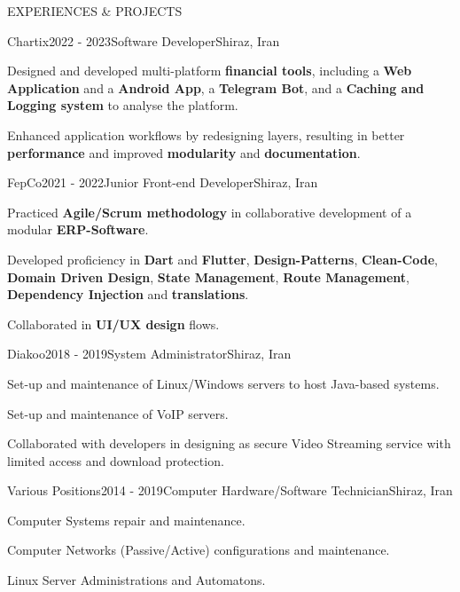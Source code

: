 \documentclass[
	a4paper, %
	12pt, %
]{resume} %
\begin{document}
\begin{rSection}{EXPERIENCES \& PROJECTS}
	\begin{rSubsection}{Chartix}{2022 - 2023}{Software Developer}{Shiraz, Iran}
        \item Designed and developed multi-platform \textbf{financial tools}, including a \textbf{Web Application} and a \textbf{Android App}, a \textbf{Telegram Bot}, and a \textbf{Caching and Logging system} to analyse the platform. 
        \item Enhanced application workflows by redesigning layers, resulting in better \textbf{performance} and improved \textbf{modularity} and \textbf{documentation}.
        \break {}      
	\end{rSubsection}

	\begin{rSubsection}{FepCo}{2021 - 2022}{Junior Front-end Developer}{Shiraz, Iran}
	   	\item Practiced \textbf{Agile/Scrum methodology} in collaborative development of a modular \textbf{ERP-Software}.
        \item Developed proficiency in \textbf{Dart} and \textbf{Flutter}, \textbf{Design-Patterns}, \textbf{Clean-Code},  \textbf{Domain Driven Design}, \textbf{State Management}, \textbf{Route Management}, \textbf{Dependency Injection} and \textbf{translations}.
		\item Collaborated in \textbf{UI/UX design} flows.
        \break {}    
	\end{rSubsection}

	\begin{rSubsection}{Diakoo}{2018 - 2019}{System Administrator}{Shiraz, Iran}
		\item Set-up and maintenance of Linux/Windows servers to host Java-based systems.
        \item Set-up and maintenance of VoIP servers.
        \item Collaborated with developers in designing as secure Video Streaming service with limited access and download protection.
	\end{rSubsection}

    	\begin{rSubsection}{Various Positions}{2014 - 2019}{Computer Hardware/Software Technician}{Shiraz, Iran}
		\item Computer Systems repair and maintenance.
        \item Computer Networks (Passive/Active) configurations and maintenance.
        \item Linux Server Administrations and Automatons.
	\end{rSubsection}
\bigskip
\end{rSection}
\end{document}
